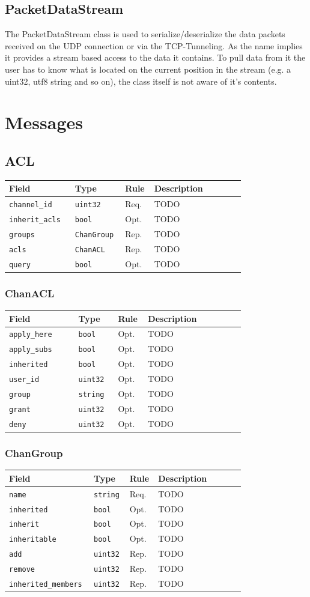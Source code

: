 \documentclass[11pt]{article} %
\newenvironment{mumbleMessageEx}
{%
	\small
	\renewcommand\arraystretch{1.5}
	\begin{tabular}{p{0.25\linewidth}p{0.13\linewidth}p{0.05\linewidth}p{0.35\linewidth}}
	Field & Type & Rule & Description \\
	\hline
}
{%
	\end{tabular}
	\renewcommand\arraystretch{1.0}
}
\newcommand{\mumbleMessageExItem}[4]{ \texttt{#1} & \texttt{#2} & #3 & #4 \\ }
\begin{document}
\subsection {PacketDataStream}
The PacketDataStream class is used to serialize/deserialize the data packets received on the UDP connection or via the TCP-Tunneling. As the name implies it provides a stream based access to the data it contains. To pull data from it the user has to know what is located on the current position in the stream (e.g. a uint32, utf8 string and so on), the class itself is not aware of it's contents.

\section{Messages}

\subsection{ACL}

\begin{mumbleMessageEx}
\mumbleMessageExItem{channel\_id}{uint32}{Req.}{TODO}
\mumbleMessageExItem{inherit\_acls}{bool}{Opt.}{TODO}
\mumbleMessageExItem{groups}{ChanGroup}{Rep.}{TODO}
\mumbleMessageExItem{acls}{ChanACL}{Rep.}{TODO}
\mumbleMessageExItem{query}{bool}{Opt.}{TODO}
\end{mumbleMessageEx}

\subsubsection{ChanACL}

\begin{mumbleMessageEx}
\mumbleMessageExItem{apply\_here}{bool}{Opt.}{TODO}
\mumbleMessageExItem{apply\_subs}{bool}{Opt.}{TODO}
\mumbleMessageExItem{inherited}{bool}{Opt.}{TODO}
\mumbleMessageExItem{user\_id}{uint32}{Opt.}{TODO}
\mumbleMessageExItem{group}{string}{Opt.}{TODO}
\mumbleMessageExItem{grant}{uint32}{Opt.}{TODO}
\mumbleMessageExItem{deny}{uint32}{Opt.}{TODO}
\end{mumbleMessageEx}

\subsubsection{ChanGroup}

\begin{mumbleMessageEx}
\mumbleMessageExItem{name}{string}{Req.}{TODO}
\mumbleMessageExItem{inherited}{bool}{Opt.}{TODO}
\mumbleMessageExItem{inherit}{bool}{Opt.}{TODO}
\mumbleMessageExItem{inheritable}{bool}{Opt.}{TODO}
\mumbleMessageExItem{add}{uint32}{Rep.}{TODO}
\mumbleMessageExItem{remove}{uint32}{Rep.}{TODO}
\mumbleMessageExItem{inherited\_members}{uint32}{Rep.}{TODO}
\end{mumbleMessageEx}
\end{document}
